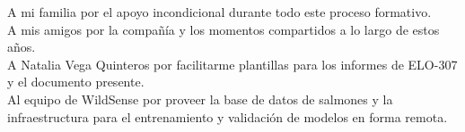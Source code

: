 \pagestyle{fancy}

\begin{thanksnf}
A mi familia por el apoyo incondicional durante todo este proceso formativo.\\
A mis amigos por la compañía y los momentos compartidos a lo largo de estos años.\\
A Natalia Vega Quinteros por facilitarme plantillas para los informes de ELO-307 y el documento presente.\\
Al equipo de WildSense por proveer la base de datos de salmones y la infraestructura para el entrenamiento y validación de modelos en forma remota.\\

\end{thanksnf}
